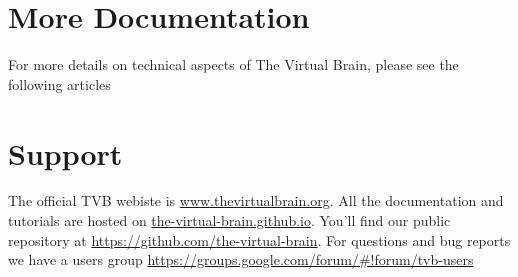 \documentclass{tufte-handout}
\begin{document}
\section{More Documentation}\label{sec:more-doc}

For more details on technical aspects of The Virtual Brain, please see the following articles
\citep{Sanz-Leon_2013, Woodman_2014}

\section{Support}\label{sec:support}

The official TVB webiste is \url{www.thevirtualbrain.org}.  
All the documentation and tutorials are hosted on \url{the-virtual-brain.github.io}.
You'll find our public  repository at \url{https://github.com/the-virtual-brain}. 
For questions and bug reports we have a users group \url{https://groups.google.com/forum/#!forum/tvb-users}



\end{document}
